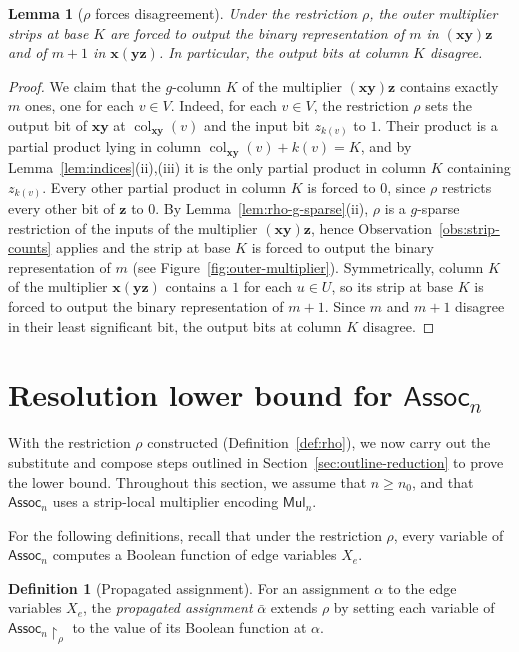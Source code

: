 \documentclass[11pt]{article}
\newtheorem{lemma}[theorem]{Lemma}
\theoremstyle{definition}
\newtheorem{definition}[theorem]{Definition}
\theoremstyle{remark}
\newcommand{\Assoc}{\mathsf{Assoc}}
\newcommand{\Mul}{\mathsf{Mul}}
\newcommand{\col}{\operatorname{col}}
\newcommand{\vv}[1]{\mathbf{#1}}
\begin{document}
\begin{lemma}[$\rho$ forces disagreement]
\label{lem:rho-outer-outputs}
Under the restriction $\rho$, the outer multiplier strips at base $K$ are forced to output the binary representation of $m$ in $(\vv{x}\vv{y})\vv{z}$ and of $m+1$ in $\vv{x}(\vv{y}\vv{z})$. In particular, the output bits at column $K$ disagree.
\end{lemma}
\begin{proof}
We claim that the $g$-column $K$ of the multiplier $(\vv{x}\vv{y})\vv{z}$ contains exactly $m$ ones, one for each $v\in V$. Indeed, for each $v\in V$, the restriction $\rho$ sets the output bit of $\vv{x}\vv{y}$ at $\col_{\vv{xy}}(v)$ and the input bit
$z_{k(v)}$ to $1$. Their product is a partial product lying in column $\col_{\vv{xy}}(v)+k(v)=K$, and by
Lemma~\ref{lem:indices}(ii),(iii) it is the only partial product in column $K$ containing $z_{k(v)}$. Every other
partial product in column $K$ is forced to $0$, since $\rho$ restricts every other bit of $\vv{z}$ to $0$. By Lemma~\ref{lem:rho-g-sparse}(ii), $\rho$ is a $g$-sparse restriction of the inputs of the multiplier $(\vv{x}\vv{y})\vv{z}$, hence Observation~\ref{obs:strip-counts} applies and the strip at base $K$ is forced to output the binary
representation of $m$ (see Figure~\ref{fig:outer-multiplier}). Symmetrically, column $K$ of the multiplier $\vv{x}(\vv{y}\vv{z})$ contains a $1$ for each $u\in U$, so its strip at base $K$ is forced to output the binary representation of $m+1$. Since $m$ and $m+1$ disagree in their least significant bit, the output bits at column $K$ disagree.
\end{proof}

\section{Resolution lower bound for \texorpdfstring{$\Assoc_n$}{Assoc\_n}}
\label{sec:reduction}

With the restriction $\rho$ constructed (Definition~\ref{def:rho}), we now carry out the substitute and compose steps outlined in Section~\ref{sec:outline-reduction} to prove the lower bound.
Throughout this section, we assume that $n\ge n_0$, and that $\Assoc_n$ uses a strip-local multiplier encoding $\Mul_n$.

For the following definitions, recall that under the restriction $\rho$, every variable of $\Assoc_n$ computes a Boolean function of edge variables $X_e$.

\begin{definition}[Propagated assignment]
\label{def:propagation}
For an assignment $\alpha$ to the edge variables $X_e$, the \emph{propagated assignment} $\bar\alpha$ extends $\rho$ by setting each
variable of $\Assoc_n\!\upharpoonright_\rho$ to the value of its Boolean function at $\alpha$.
\end{definition}
\end{document}
